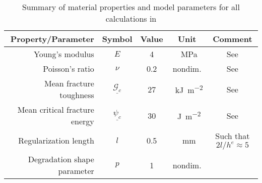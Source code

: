 \begin{table}[htb!]
  \centering
  \caption{Summary of material properties and model parameters for all calculations in }
  \begin{tabular}{r c c c c}
    \toprule
    Property/Parameter            & Symbol                      & Value & Unit                                & Comment                                       \\
    \midrule
    Young's modulus               & $E$                         & 4     & \SI{}{\mega\pascal}                 & See \cite{obrzud2010hardening, Rodriguez2006} \\
    Poisson's ratio               & $\nu$                       & 0.2   & nondim.                             & See \cite{obrzud2010hardening, Rodriguez2006} \\
    Mean fracture toughness       & $\underline{\mathcal{G}_c}$ & 27    & \SI{}{\kilo\joule\per\square\meter} & See \cite{ramsaroop2010fracture}              \\[5pt]
    Mean critical fracture energy & $\underline{\psi_c}$        & 30    & \SI{}{\joule\per\square\meter}      & See \cite{ramsaroop2010fracture}              \\[5pt]
    Regularization length         & $l$                         & 0.5   & \SI{}{\milli\meter}                 & Such that $2l/h^e \approx 5$                  \\
    Degradation shape parameter   & $p$                         & 1     & nondim.                             &                                               \\
    \bottomrule
  \end{tabular}
  \label{tab: clay}
\end{table}

